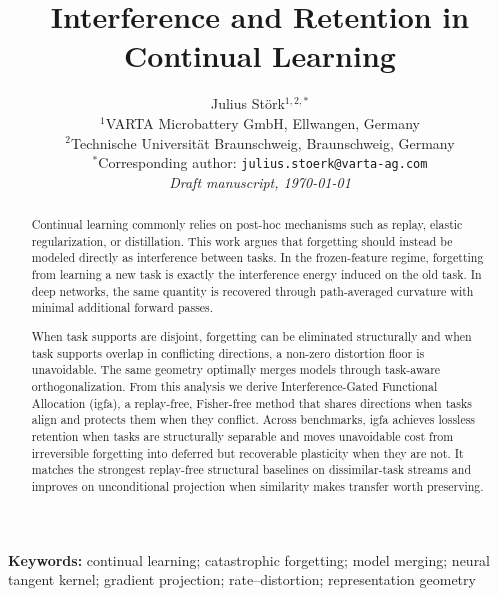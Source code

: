 \documentclass[10pt,a4paper]{article}
\title{\textbf{Interference and Retention in Continual Learning}}
\author{Julius St\"ork$^{1,2,\ast}$\\[2pt]
\small $^1$VARTA Microbattery GmbH, Ellwangen, Germany\\
\small $^2$Technische Universit\"at Braunschweig, Braunschweig, Germany\\
\small $^\ast$Corresponding author: \texttt{julius.stoerk@varta-ag.com}\\[2pt]
\small \textit{Draft manuscript, \today}}
\date{}
\theoremstyle{plain}
\theoremstyle{definition}
\newcommand{\IGFA}{igfa}
\begin{document}
\maketitle

\begin{abstract}
\noindent
Continual learning commonly relies on post-hoc mechanisms such as replay, elastic
regularization, or distillation. This work argues that forgetting should instead be modeled directly as interference between tasks.
In the frozen-feature regime,
forgetting from learning a new task is exactly the interference energy induced on the old task.
In deep networks, the same quantity is recovered through path-averaged curvature with minimal additional forward passes.

When task supports are disjoint, forgetting can be eliminated structurally and when task supports overlap in conflicting directions, a non-zero distortion floor is unavoidable.
The same geometry optimally merges models through task-aware orthogonalization.
From this analysis we derive Interference-Gated Functional
Allocation (\IGFA), a replay-free, Fisher-free method that shares
directions when tasks align and protects them when they conflict.
Across benchmarks, igfa achieves lossless retention when tasks are structurally
separable and moves unavoidable cost from irreversible forgetting into deferred but recoverable plasticity when they are not.
It matches the strongest replay-free structural baselines on dissimilar-task streams and
improves on unconditional projection when similarity makes transfer worth preserving.
\end{abstract}

\vspace{1ex}
\noindent\textbf{Keywords:} continual learning; catastrophic forgetting; model
merging; neural tangent kernel; gradient projection; rate--distortion; representation geometry
\end{document}

